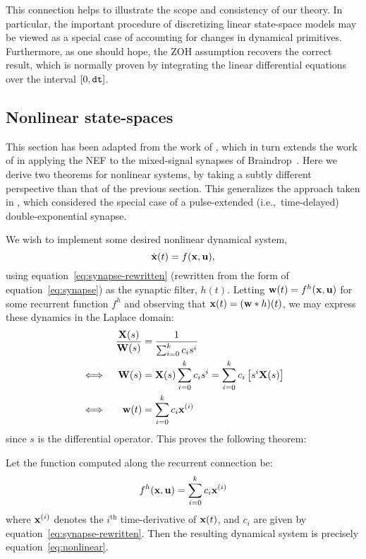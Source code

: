 This connection helps to illustrate the scope and consistency of our theory.
In particular, the important procedure of discretizing linear state-space models may be viewed as a special case of accounting for changes in dynamical primitives.
Furthermore, as one should hope, the ZOH assumption recovers the correct result, which is normally proven by integrating the linear differential equations over the interval $[0\text{,}\, \texttt{dt}{}]$.

\subsection{Nonlinear state-spaces}
\label{sec:nonlinear-extensions}

This section has been adapted from the work of \citet{voelker2017iscas}, which in turn extends the work of \citet{voelker2017neuromorphic} in applying the NEF to the mixed-signal synapses of Braindrop~\citep{braindrop2019}.
Here we derive two theorems for nonlinear systems, by taking a subtly different perspective than that of the previous section.
This generalizes the approach taken in \citet{voelker2017neuromorphic}, which considered the special case of a pulse-extended (i.e.,~time-delayed) double-exponential synapse.

We wish to implement some desired nonlinear dynamical system,
\begin{equation} \label{eq:nonlinear}
\dot{\mathbf{x}}(t) = f(\mathbf{x}, \mathbf{u}) \text{,}
\end{equation}
using equation~\ref{eq:synapse-rewritten} (rewritten from the form of equation~\ref{eq:synapse}) as the synaptic filter, $h(t)$.
Letting $\mathbf{w}(t) = f^h(\mathbf{x}, \mathbf{u})$ for some recurrent function $f^h$ and observing that $\mathbf{x}(t) = (\mathbf{w} \ast h)(t)$, we may express these dynamics in the Laplace domain:
\begin{align*}
&& \frac{\mathbf{X}(s)}{\mathbf{W}(s)} &= \frac{1}{\sum_{i=0}^k c_i s^i} \\
\iff && \mathbf{W}(s) &= \mathbf{X}(s) \sum_{i=0}^k c_i s^i = \sum_{i=0}^k c_i \left[ s^i \mathbf{X}(s) \right] \\
\iff && \mathbf{w}(t) &= \sum_{i=0}^k c_i \mathbf{x}^{(i)}
\end{align*}
since $s$ is the differential operator. This proves the following theorem:
\begin{theorem} \label{thm:p3cont-nonlinear}
Let the function computed along the recurrent connection be:
\begin{align}
f^h(\mathbf{x}, \mathbf{u}) = \sum_{i=0}^k c_i \mathbf{x}^{(i)}
\end{align}
where $\mathbf{x}^{(i)}$ denotes the $i^\text{th}$ time-derivative of $\mathbf{x}(t)$, and $c_i$ are given by equation~\ref{eq:synapse-rewritten}. Then the resulting dynamical system is precisely equation~\ref{eq:nonlinear}.
\end{theorem}

